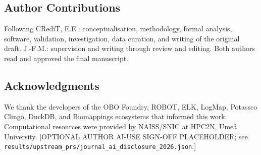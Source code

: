 \documentclass[10pt]{article}
\theoremstyle{accentdef}
\begin{document}
\subsection*{Author Contributions}
Following CRediT, E.E.: conceptualisation, methodology, formal analysis, software, validation, investigation, data curation, and writing of the original draft. J.-F.M.: supervision and writing through review and editing. Both authors read and approved the final manuscript.

\subsection*{Acknowledgments}
We thank the developers of the OBO Foundry, ROBOT, ELK, LogMap, Potassco Clingo, DuckDB, and Biomappings ecosystems that informed this work. Computational resources were provided by NAISS/SNIC at HPC2N, Ume{\aa} University. [OPTIONAL AUTHOR AI-USE SIGN-OFF PLACEHOLDER; see \texttt{results/upstream\_prs/journal\_ai\_disclosure\_2026.json}.]



\end{document}
